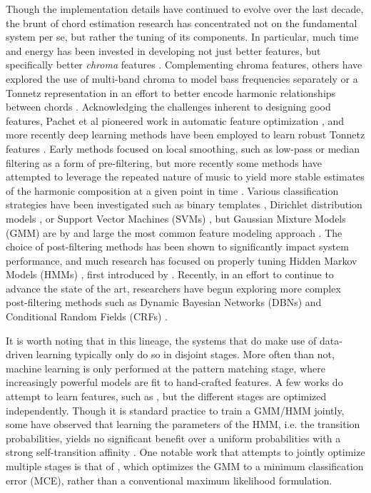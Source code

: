 Though the implementation details have continued to evolve over the last decade, the brunt of chord estimation research has concentrated not on the fundamental system per se, but rather the tuning of its components.
In particular, much time and energy has been invested in developing not just better features, but specifically better \emph{chroma} features \cite{muller2010}.
Complementing chroma features, others have explored the use of multi-band chroma to model bass frequencies separately \cite{Mauch2009?} or a Tonnetz representation in an effort to better encode harmonic relationships between chords \cite{Lee2007}.
Acknowledging the challenges inherent to designing good features, Pachet et al pioneered work in automatic feature optimization \cite{pachet2004}, and more recently deep learning methods have been employed to learn robust Tonnetz features \cite{ejh2011}.
Early methods focused on local smoothing, such as low-pass \cite{} or median \cite{} filtering as a form of pre-filtering, but more recently some methods have attempted to leverage the repeated nature of music to yield more stable estimates of the harmonic composition at a given point in time \cite{Cho2011}.
Various classification strategies have been investigated such as binary templates \cite{?}, Dirichlet distribution models \cite{Burgoyne2008?}, or Support Vector Machines (SVMs) \cite{weller2009}, but Gaussian Mixture Models (GMM) are by and large the most common feature modeling approach \cite{a,b,c}.
The choice of post-filtering methods has been shown to significantly impact system performance, and much research has focused on properly tuning Hidden Markov Models (HMMs) \cite{Cho2010}, first introduced by \cite{sheh2003}.
Recently, in an effort to continue to advance the state of the art, researchers have begun exploring more complex post-filtering methods such as Dynamic Bayesian Networks (DBNs) \cite{mauch2010b, McVicar2013} and Conditional Random Fields (CRFs) \cite{?}.

It is worth noting that in this lineage, the systems that do make use of data-driven learning typically only do so in disjoint stages.
More often than not, machine learning is only performed at the pattern matching stage, where increasingly powerful models are fit to hand-crafted features.
A few works do attempt to learn features, such as \cite{MauchNNLS, Humphrey2012?}, but the different stages are optimized independently.
Though it is standard practice to train a GMM/HMM jointly, some have observed that learning the parameters of the HMM, i.e. the transition probabilities, yields no significant benefit over a uniform probabilities with a strong self-transition affinity \cite{Cho2014PhD}.
One notable work that attempts to jointly optimize multiple stages is that of \cite{Kim2012}, which optimizes the GMM to a minimum classification error (MCE), rather than a conventional maximum likelihood formulation.


